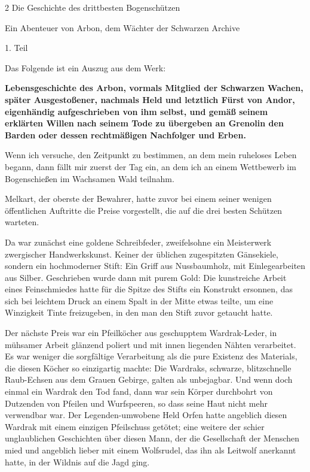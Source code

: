 \documentclass[10pt, a4paper, oneside]{book}
\begin{document}
\begin{multicols}{2}
Die Geschichte des drittbesten Bogenschützen

Ein Abenteuer von Arbon, dem Wächter der Schwarzen Archive

1. Teil\bigskip

Das Folgende ist ein Auszug aus dem Werk:

\textbf{Lebensgeschichte des Arbon, vormals Mitglied der Schwarzen Wachen, später Ausgestoßener, nachmals Held und letztlich Fürst von Andor, eigenhändig aufgeschrieben von ihm selbst, und gemäß seinem erklärten Willen nach seinem Tode zu übergeben an Grenolin den Barden oder dessen rechtmäßigen Nachfolger und Erben.}\bigskip

Wenn ich versuche, den Zeitpunkt zu bestimmen, an dem mein ruheloses Leben begann, dann fällt mir zuerst der Tag ein, an dem ich an einem Wettbewerb im Bogenschießen im Wachsamen Wald teilnahm.

Melkart, der oberste der Bewahrer, hatte zuvor bei einem seiner wenigen öffentlichen Auftritte die Preise vorgestellt, die auf die drei besten Schützen warteten.

Da war zunächst eine goldene Schreibfeder, zweifelsohne ein Meisterwerk zwergischer Handwerkskunst. Keiner der üblichen zugespitzten Gänsekiele, sondern ein hochmoderner Stift: Ein Griff aus Nussbaumholz, mit Einlegearbeiten aus Silber. Geschrieben wurde dann mit purem Gold: Die kunstreiche Arbeit eines Feinschmiedes hatte für die Spitze des Stifts ein Konstrukt ersonnen, das sich bei leichtem Druck an einem Spalt in der Mitte etwas teilte, um eine Winzigkeit Tinte freizugeben, in den man den Stift zuvor getaucht hatte.

Der nächste Preis war ein Pfeilköcher aus geschupptem Wardrak-Leder, in mühsamer Arbeit glänzend poliert und mit innen liegenden Nähten verarbeitet. Es war weniger die sorgfältige Verarbeitung als die pure Existenz des Materials, die diesen Köcher so einzigartig machte: Die Wardraks, schwarze, blitzschnelle Raub-Echsen aus dem Grauen Gebirge, galten als unbejagbar. Und wenn doch einmal ein Wardrak den Tod fand, dann war sein Körper durchbohrt von Dutzenden von Pfeilen und Wurfspeeren, so dass seine Haut nicht mehr verwendbar war. Der Legenden-umwobene Held Orfen hatte angeblich diesen Wardrak mit einem einzigen Pfeilschuss getötet; eine weitere der schier unglaublichen Geschichten über diesen Mann, der die Gesellschaft der Menschen mied und angeblich lieber mit einem Wolfsrudel, das ihn als Leitwolf anerkannt hatte, in der Wildnis auf die Jagd ging.


\end{multicols}
\end{document}
